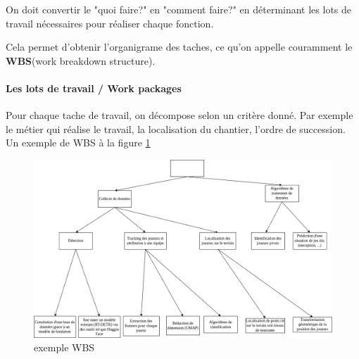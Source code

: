 On doit convertir le "quoi faire?" en "comment faire?" en déterminant les lots de travail nécessaires pour réaliser chaque fonction.

Cela permet d'obtenir l'organigrame des taches, ce qu'on appelle couramment le \textbf{WBS}(work breakdown structure).\\

\paragraph*{Les lots de travail / Work packages}
Pour chaque tache de travail, on décompose selon un critère donné. Par exemple le métier qui réalise le travail, la localisation du chantier, l'ordre de succession.
Un exemple de WBS à la figure \ref{fig:exemple_wbs}
\begin{figure}
	\begin{center}
		\includegraphics[scale=0.65]{images/wbs.png}
		\caption{exemple WBS}
		\label{fig:exemple_wbs}
	\end{center}
\end{figure}
